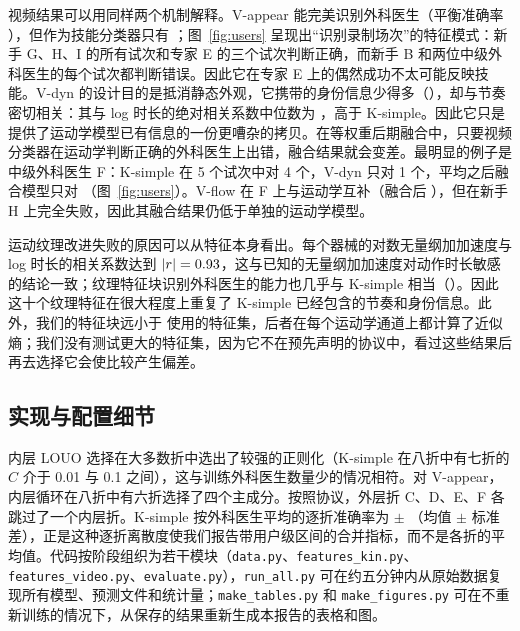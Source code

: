 视频结果可以用同样两个机制解释。V-appear 能完美识别外科医生（平衡准确率 \IdVAppear{}），但作为技能分类器只有 \FMTwoA{}；图~\ref{fig:users} 呈现出“识别录制场次”的特征模式：新手 G、H、I 的所有试次和专家 E 的三个试次判断正确，而新手 B 和两位中级外科医生的每个试次都判断错误。因此它在专家 E 上的偶然成功不太可能反映技能。V-dyn 的设计目的是抵消静态外观，它携带的身份信息少得多（\IdVDyn{}），却与节奏密切相关：其与 log 时长的绝对相关系数中位数为 \PaceVDyn{}，高于 K-simple。因此它只是提供了运动学模型已有信息的一份更嘈杂的拷贝。在等权重后期融合中，只要视频分类器在运动学判断正确的外科医生上出错，融合结果就会变差。最明显的例子是中级外科医生 F：K-simple 在 5 个试次中对 4 个，V-dyn 只对 1 个，平均之后融合模型只对 \UFMThree{}（图~\ref{fig:users}）。V-flow 在 F 上与运动学互补（融合后 \UFMThreeC{}），但在新手 H 上完全失败，因此其融合结果仍低于单独的运动学模型。

运动纹理改进失败的原因可以从特征本身看出。每个器械的对数无量纲加加速度与 log 时长的相关系数达到 $|r| = 0.93{}$，这与已知的无量纲加加速度对动作时长敏感的结论一致\citep{hogan2009smoothness}；纹理特征块识别外科医生的能力也几乎与 K-simple 相当（\IdKTexture{}）。因此这十个纹理特征在很大程度上重复了 K-simple 已经包含的节奏和身份信息。此外，我们的特征块远小于 \citet{zia2018rmis} 使用的特征集，后者在每个运动学通道上都计算了近似熵；我们没有测试更大的特征集，因为它不在预先声明的协议中，看过这些结果后再去选择它会使比较产生偏差。

\subsection{实现与配置细节}

内层 LOUO 选择在大多数折中选出了较强的正则化（K-simple 在八折中有七折的 $C$ 介于 0.01 与 0.1 之间），这与训练外科医生数量少的情况相符。对 V-appear，内层循环在八折中有六折选择了四个主成分。按照协议，外层折 C、D、E、F 各跳过了一个内层折。K-simple 按外科医生平均的逐折准确率为 \FoldAccMOne{} $\pm$ \FoldSdMOne{}（均值 $\pm$ 标准差），正是这种逐折离散度使我们报告带用户级区间的合并指标，而不是各折的平均值。代码按阶段组织为若干模块（\texttt{data.py}、\texttt{features\_kin.py}、\texttt{features\_video.py}、\texttt{evaluate.py}），\texttt{run\_all.py} 可在约五分钟内从原始数据复现所有模型、预测文件和统计量；\texttt{make\_tables.py} 和 \texttt{make\_figures.py} 可在不重新训练的情况下，从保存的结果重新生成本报告的表格和图。
